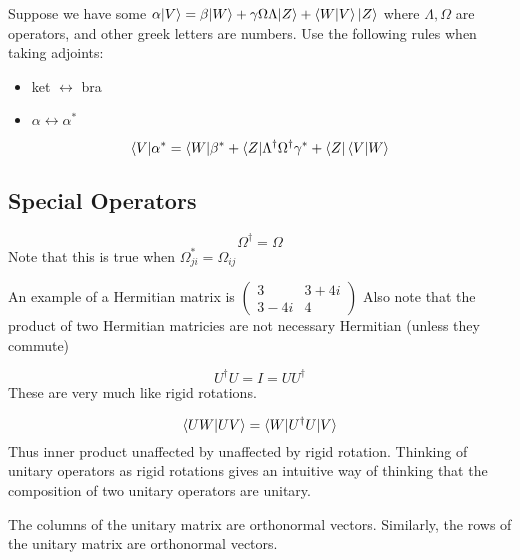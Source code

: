 \documentclass[11pt]{scrartcl}
\begin{document}
Suppose we have some $ \alpha |V \rangle  = \beta |W \rangle  + \gamma \Omega \Lambda |Z \rangle + \braket{W|V} |Z \rangle  $ where $ \Lambda, \Omega $ are operators, and other greek letters are numbers. Use the following rules when taking adjoints:
\begin{itemize}
	\item ket $ \leftrightarrow $ bra
	\item $ \alpha \leftrightarrow \alpha ^ * $
\end{itemize}

\begin{equation}
	\langle V | \alpha ^* = \langle W |  \beta^* + \langle Z | \Lambda ^{\dag} \Omega ^{\dag} \gamma ^* + \langle Z |  \braket{V|W} 
\end{equation}

\subsection{Special Operators}
\begin{definition}
\begin{equation}
	\Omega ^{\dag}  = \Omega
\end{equation}
Note that this is true when $ \Omega _{ji} ^* = \Omega _{ij}  $
\end{definition}
An example of a Hermitian matrix is $ \begin{pmatrix}
	3 & 3 + 4i \\ 3 - 4i & 4
\end{pmatrix}  $
Also note that the product of two Hermitian matricies are not necessary Hermitian (unless they commute)

\begin{definition}
\begin{equation}
	U ^{\dag} U =  I = U U ^{\dag}  
\end{equation}
These are very much like rigid rotations. 
\end{definition}

\begin{equation}
	\braket{UW|UV} = \langle W | U ^{\dag} U |V \rangle 
\end{equation}
Thus inner product unaffected by unaffected by rigid rotation. Thinking of unitary operators as rigid rotations gives an intuitive way of thinking that the composition of two unitary operators are unitary.  

The columns of the unitary matrix are orthonormal vectors. Similarly, the rows of the unitary matrix are orthonormal vectors. 
\end{document}
